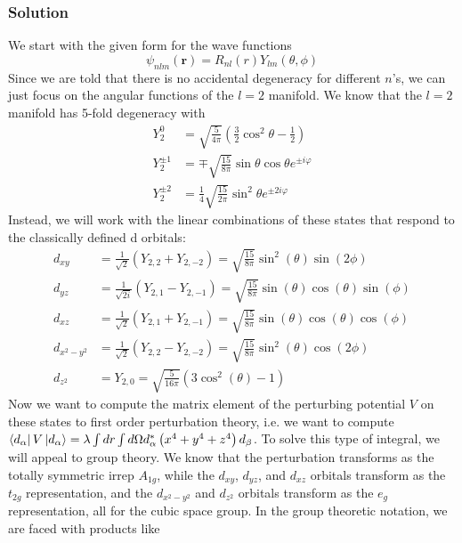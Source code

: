\documentclass{article}
\begin{document}
\subsubsection{Solution}
We start with the given form for the wave functions
\begin{equation}
    \psi _{nlm}(\mathbf{r}) = R_{nl}(r)Y_{lm}(\theta, \phi)
\end{equation}
Since we are told that there is no accidental degeneracy for different $n$'s, we can just focus on the angular functions of the $l=2$ manifold. We know that the $l=2$ manifold has 5-fold degeneracy with
\begin{equation}
\begin{aligned}
Y_2^0 & =\sqrt{\frac{5}{4 \pi}}\left(\frac{3}{2} \cos ^2 \theta-\frac{1}{2}\right) \\
Y_2^{ \pm 1} & =\mp \sqrt{\frac{15}{8 \pi}} \sin \theta \cos \theta e^{ \pm i \varphi} \\
Y_2^{ \pm 2} & =\frac{1}{4} \sqrt{\frac{15}{2 \pi}} \sin ^2 \theta e^{ \pm 2 i \varphi}
\end{aligned}
\end{equation}
Instead, we will work with the linear combinations of these states that respond to the classically defined d orbitals:
\begin{align}
    d_{xy} &= \frac{1}{\sqrt{2}}(Y_{2, 2} + Y_{2, -2}) = \sqrt{\frac{15}{8\pi}}\sin^2(\theta)\sin(2\phi)\\
    d_{yz} &= \frac{1}{\sqrt{2i}}(Y_{2, 1} - Y_{2, -1}) = \sqrt{\frac{15}{8\pi}}\sin(\theta)\cos(\theta)\sin(\phi)\\
    d_{xz} &= \frac{1}{\sqrt{2}}(Y_{2, 1} + Y_{2, -1}) = \sqrt{\frac{15}{8\pi}}\sin(\theta)\cos(\theta)\cos(\phi)\\
    d_{x^2-y^2} &= \frac{1}{\sqrt{2}}(Y_{2, 2} - Y_{2, -2}) = \sqrt{\frac{15}{8\pi}}\sin^2(\theta)\cos(2\phi)\\
    d_{z^2} &= Y_{2, 0} = \sqrt{\frac{5}{16\pi}}(3\cos^2(\theta) - 1)
\end{align}
Now we want to compute the matrix element of the perturbing potential $V$ on these states to first order perturbation theory, i.e. we want to compute $\bra{d_{\alpha}}V\ket{d_{\alpha }} = \lambda\int dr \int d\Omega d_{\alpha}^*\left(x^4 + y^4 + z^4\right)d_{\beta}$. To solve this type of integral, we will appeal to group theory. We know that the perturbation transforms as the totally symmetric irrep $A_{1g}$, while the $d_{xy}$, $d_{yz}$, and $d_{xz}$ orbitals transform as the $t_{2g}$ representation, and the $d_{x^2-y^2}$ and $d_{z^2}$ orbitals transform as the $e_g$ representation, all for the cubic space group. In the group theoretic notation, we are faced with products like
\end{document}
